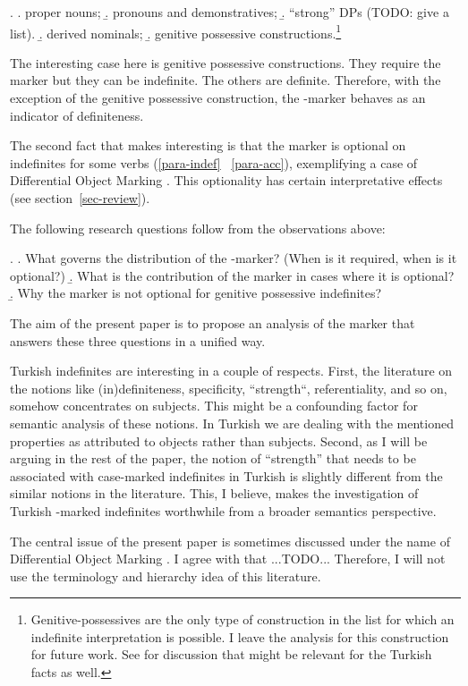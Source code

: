 \documentclass[11pt,a4paper]{article}
\begin{document}
\ex.
\a. proper nouns;
\b. pronouns and demonstratives;
\b. ``strong'' DPs (TODO: give a list).
\b. derived nominals;
\b. genitive possessive constructions.\footnote{Genitive-possessives
are the only type of construction in the list for which an indefinite
interpretation is possible. I leave the analysis for this construction
for future work. See  for discussion that might be
relevant for the Turkish facts as well.}

The interesting case here is genitive possessive constructions. They require the
marker but they can be indefinite. The others are definite. Therefore, with the
exception of the genitive possessive construction, the \acc-marker behaves as an
indicator of definiteness.

The second fact that makes  interesting is that the marker is
optional on indefinites for some verbs (\ref{para-indef} \versus\
\ref{para-acc}), exemplifying a case of Differential Object Marking
\cttxp{aissen03}. This optionality has certain interpretative effects (see
section~\ref{sec-review}).

The following research questions follow from the observations above:

\ex.\label{res-ques}
\a.\label{res-ques-syn} What governs the distribution of the \acc-marker? (When
is it required, when is it optional?)
\b.\label{res-ques-sem} What is the contribution of the marker in cases where it is optional?
\b.\label{res-ques-genposs} Why the marker is not optional for genitive possessive indefinites?


The aim of the present paper is to propose an analysis of the marker that
answers these three questions in a unified way.

Turkish indefinites are interesting in a couple of respects. First,
the literature on the notions like (in)definiteness, specificity,
``strength``, referentiality, and so on, somehow concentrates on
subjects. This might be a confounding factor for semantic analysis of
these notions. In Turkish we are dealing with the mentioned properties
as attributed to objects rather than subjects.  Second, as I will be
arguing in the rest of the paper, the notion of ``strength'' that
needs to be associated with case-marked indefinites in Turkish is
slightly different from the similar notions in the literature. This, I
believe, makes the investigation of Turkish \acc-marked indefinites
worthwhile from a broader semantics perspective. 

The central issue of the present paper is sometimes discussed under
the name of Differential Object Marking \cttxp{aissen03}. I agree with
\ctnm{lopez12} that ...TODO... Therefore, I will not use the terminology and
hierarchy idea of this literature.
\end{document}
